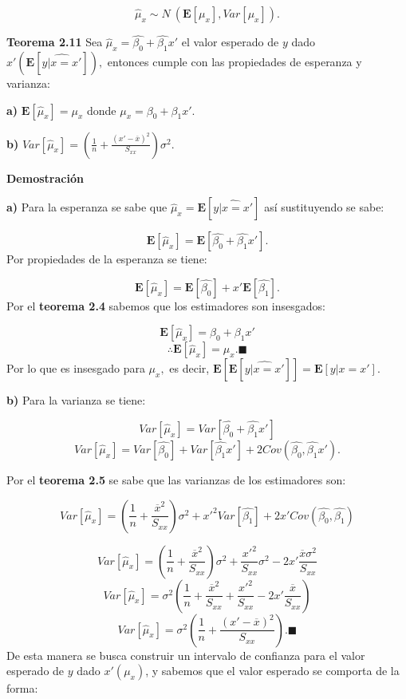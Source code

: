 \documentclass[
  a4paper,
  oneside,
  openany]{book}
\begin{document}
\[\hat{\mu}_{x}\sim N \ (\mathbf{E}[\mu_{x}],Var[\mu_{x}]).\]

\textbf{Teorema 2.11} Sea \(\hat{\mu}_{x}=\hat{\beta_{0}}+\hat{\beta_{1}}x'\) el valor esperado de \(y\) dado \(x'\left( \mathbf{E}[\widehat{y|x=x'}]\right),\) entonces cumple con las propiedades de esperanza y varianza:

\textbf{a)} \(\mathbf{E}[\hat{\mu}_{x}]=\mu_{x}\) donde \(\mu_{x}=\beta_{0}+\beta_{1}x'.\)

\textbf{b)} \(Var[\hat{\mu}_{x}]=\left(\frac{1}{n}+\frac{(x'-\overline{x})^2}{S_{xx}}\right)\sigma^2.\)

\textbf{Demostración}

\textbf{a)} Para la esperanza se sabe que \(\hat{\mu}_{x}=\mathbf{E}[\widehat{y|x=x'}]\) así sustituyendo se sabe:

\[\mathbf{E}[\hat{\mu}_{x}]=\mathbf{E}\left[\hat{\beta_{0}}+\hat{\beta_{1}}x' \right].\]
Por propiedades de la esperanza se tiene:

\[\mathbf{E}[\hat{\mu}_{x}]=\mathbf{E}\left[\hat{\beta_{0}}\right]+x'\mathbf{E}\left[\hat{\beta_{1}} \right].\]
Por el \textbf{teorema 2.4} sabemos que los estimadores son insesgados:

\[\mathbf{E}[\hat{\mu}_{x}]=\beta_{0}+\beta_{1}x'\]
\[\therefore \mathbf{E}[\hat{\mu}_{x}]=\mu_{x}. \blacksquare\]
Por lo que es insesgado para \(\mu_{x},\) es decir, \(\mathbf{E}\left[\mathbf{E}[\widehat{y|x=x'}] \right]=\mathbf{E}[y|x=x'].\)

\textbf{b)} Para la varianza se tiene:

\[Var[\hat{\mu}_{x}]=Var\left[\hat{\beta_{0}}+\hat{\beta_{1}}x'\right]\]
\[Var[\hat{\mu}_{x}]=Var[\hat{\beta_{0}}]+Var[\hat{\beta_{1}}x']+2Cov(\hat{\beta_{0}},\hat{\beta_{1}}x').\]

Por el \textbf{teorema 2.5} se sabe que las varianzas de los estimadores son:

\[Var[\hat{\mu}_{x}]=\left( \frac{1}{n}+\frac{\overline{x}^2}{S_{xx}}\right)\sigma^2+x'^2Var[\hat{\beta_{1}}]+2x'Cov(\hat{\beta_{0}},\hat{\beta_{1}})\]

\[Var[\hat{\mu}_{x}]=\left( \frac{1}{n}+\frac{\overline{x}^2}{S_{xx}}\right)\sigma^2+\frac{x'^2}{S_{xx}}\sigma^2-2x'\frac{\overline{x}\sigma^2}{S_{xx}}\]
\[Var[\hat{\mu}_{x}]=\sigma^2\left( \frac{1}{n}+\frac{\overline{x}^2}{S_{xx}}+\frac{x'^2}{S_{xx}}-2x'\frac{\overline{x}}{S_{xx}}\right)\]
\[Var[\hat{\mu}_{x}]=\sigma^2\left( \frac{1}{n}+\frac{(x'-\overline{x})^2}{S_{xx}}\right). \blacksquare\]
De esta manera se busca construir un intervalo de confianza para el valor esperado de \(y\) dado \(x'(\mu_{x})\), y sabemos que el valor esperado se comporta de la forma:
\end{document}
